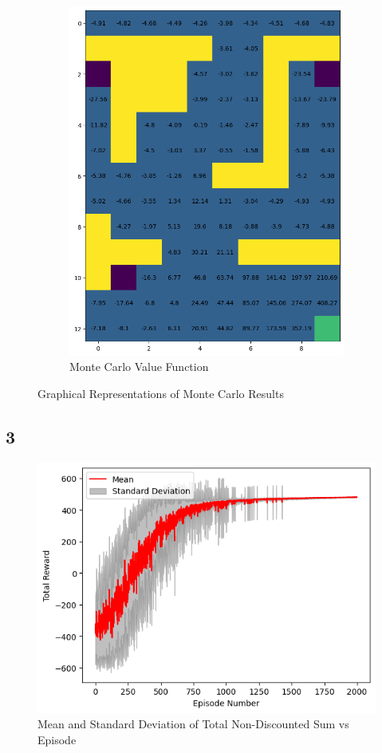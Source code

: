 \begin{figure}[H]
\begin{subfigure}[b]{0.49\textwidth}
        \centering
        \includegraphics[width=\textwidth]{assets/mc/mc_value.png}        
        \caption{Monte Carlo Value Function}
    \end{subfigure}
    \caption*{Graphical Representations of Monte Carlo Results}
\end{figure} 

\subsection*{3}
\begin{figure}[H]
    \centering
    \includegraphics*{assets/mc/mean_std_plot.png}
    \caption*{Mean and Standard Deviation of 
    Total Non-Discounted Sum vs Episode}
\end{figure} 

